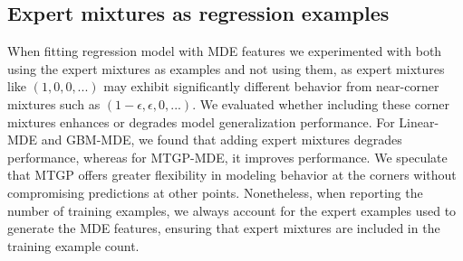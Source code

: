 \begin{table}[htbp]
\begin{center}
\begin{small}
\begin{sc}
\end{sc}
\end{small}
\end{center}
\caption{Hardware used for each model size.}
\label{hardware}
\end{table}




\subsection{Expert mixtures as regression examples}

When fitting regression model with MDE features we experimented with both using the expert mixtures as examples and not using them, as expert mixtures like $(1,0,0, ...)$ may exhibit significantly different behavior from near-corner mixtures such as $(1-\epsilon, \epsilon, 0, ...)$. We evaluated whether including these corner mixtures enhances or degrades model generalization performance. For Linear-MDE and GBM-MDE, we found that adding expert mixtures degrades performance, whereas for MTGP-MDE, it improves performance. We speculate that MTGP offers greater flexibility in modeling behavior at the corners without compromising predictions at other points. Nonetheless, when reporting the number of training examples, we always account for the expert examples used to generate the MDE features, ensuring that expert mixtures are included in the training example count.

